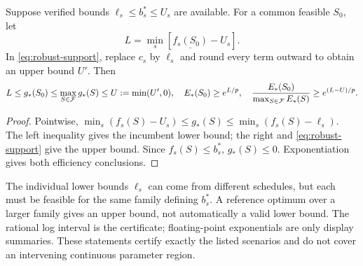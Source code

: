\begin{proposition}\label{prop:robust-normalizers}
Suppose verified bounds $\ell_s\le b_s^*\le U_s$ are available.
For a common feasible $S_0$, let
\begin{equation}\label{eq:robust-certified-interval}
 L=\min_s[\underline{f_s(S_0)}-U_s].
\end{equation}
In \eqref{eq:robust-support}, replace $c_s$ by $\ell_s$ and round every
term outward to obtain an upper bound $U'$. Then
\[
 L\le g_*(S_0)\le\max_{S\in\mathcal F}g_*(S)\le U:=\min(U',0),
 \quad E_*(S_0)\ge e^{L/p},\quad
 \frac{E_*(S_0)}{\max_{S\in\mathcal F}E_*(S)}\ge e^{(L-U)/p}.
\]
\end{proposition}
\begin{proof}
Pointwise,
$\min_s(f_s(S)-U_s)\le g_*(S)\le\min_s(f_s(S)-\ell_s)$.
The left inequality gives the incumbent lower bound; the right and
\eqref{eq:robust-support} give the upper bound. Since $f_s(S)\le b_s^*$,
$g_*(S)\le0$. Exponentiation gives both efficiency conclusions.
\end{proof}
The individual lower bounds $\ell_s$ can come from different schedules, but
each must be feasible for the same family defining $b_s^*$. A reference
optimum over a larger family gives an upper bound, not automatically a valid
lower bound. The rational log interval is the certificate; floating-point
exponentials are only display summaries. These statements certify exactly
the listed scenarios and do not cover an intervening continuous parameter
region.

